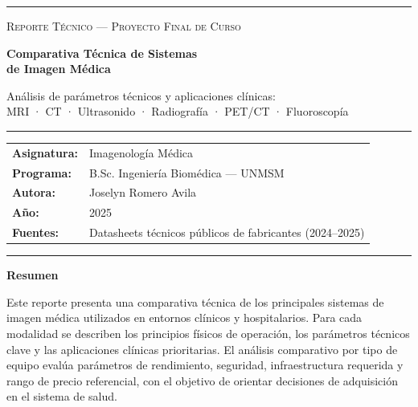 \documentclass[11pt, a4paper]{article}
\begin{document}

\thispagestyle{empty}

\vspace*{1.5cm}

{\noindent\color{teal}\rule{\linewidth}{2pt}}
\vspace{0.3cm}

{\noindent\fontsize{9}{11}\selectfont\color{graym}\textsc{Reporte Técnico — Proyecto Final de Curso}}

\vspace{0.4cm}

{\noindent\fontsize{24}{30}\selectfont\bfseries\color{navy}
Comparativa Técnica de Sistemas\\[4pt]
de Imagen Médica}

\vspace{0.5cm}

{\noindent\fontsize{12}{16}\selectfont\color{grayd}
Análisis de parámetros técnicos y aplicaciones clínicas:\\
MRI · CT · Ultrasonido · Radiografía · PET/CT · Fluoroscopía}

\vspace{0.8cm}
{\noindent\color{graybrd}\rule{\linewidth}{0.5pt}}
\vspace{0.5cm}

\begin{tabular}{@{}ll}
  \textbf{\color{accent}Asignatura:}  & Imagenología Médica \\[3pt]
  \textbf{\color{accent}Programa:}    & B.Sc. Ingeniería Biomédica — UNMSM \\[3pt]
  \textbf{\color{accent}Autora:}      & Joselyn Romero Avila \\[3pt]
  \textbf{\color{accent}Año:}         & 2025 \\[3pt]
  \textbf{\color{accent}Fuentes:}     & Datasheets técnicos públicos de fabricantes (2024--2025) \\
\end{tabular}

\vspace{0.8cm}
{\noindent\color{graybrd}\rule{\linewidth}{0.5pt}}
\vspace{0.5cm}

\noindent\textbf{\color{navy}Resumen}

\vspace{0.3cm}
\noindent Este reporte presenta una comparativa técnica de los principales sistemas de imagen médica
utilizados en entornos clínicos y hospitalarios. Para cada modalidad se describen los principios
físicos de operación, los parámetros técnicos clave y las aplicaciones clínicas prioritarias.
El análisis comparativo por tipo de equipo evalúa parámetros de rendimiento, seguridad,
infraestructura requerida y rango de precio referencial, con el objetivo de orientar decisiones
de adquisición en el sistema de salud.
\end{document}

